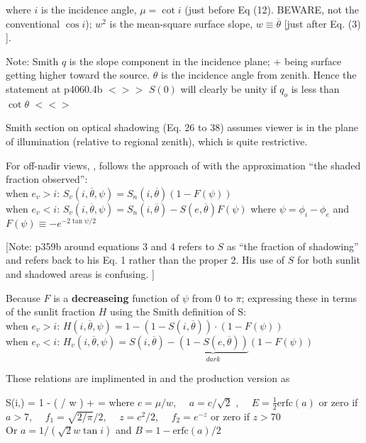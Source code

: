 \documentclass{article}
\newcommand{\erfc}{\mathrm{erfc}}  %
\newcommand{\bq}{$ < \! > \!   \! >$ } %
\newcommand{\eq}{ $< \! \! < \! > $ } %
\begin{document}
where $i$ is the incidence angle, $\mu = \cot i $ (just before Eq (12). BEWARE, not the conventional $\cos i$); $w^2$ is the mean-square
surface slope, $w \equiv \overline{\theta}$ [just after Eq. (3) ].

Note: Smith $q$ is the slope component in the incidence plane; + being surface
getting higher toward the source. $\theta$ is the incidence angle from
zenith. Hence the statement at p4060.4b \bq $S(0)$ will clearly be unity if
$q_o$ is less than $\cot \theta$ \eq

Smith section on optical shadowing (Eq. 26 to 38) assumes viewer is in the plane
of illumination (relative to regional zenith), which is quite restrictive.

  For off-nadir views,  , follows the approach of  with the approximation ``the shaded fraction observed'':
\\ when $e_v>i$: $S_v(i,\overline{\theta},\psi)=S_n(i,\overline{\theta}) \left( 1-F(\psi) \right) $
\\ when $e_v<i$: $S_v(i,\overline{\theta},\psi)=S_n(i,\overline{\theta}) -S(e,\overline{\theta})F(\psi) $
\qi  where $\psi = \phi_i-\phi_e$  and $F(\psi) \equiv -e^{-2 \tan \psi/2} $

[Note:   p359b around equations 3 and 4 refers to $S$ as ``the fraction of shadowing'' and refers back to his Eq. 1 rather than the proper 2. His use of $S$  for both sunlit and shadowed areas is confusing. ]

Because $F$ is a \textbf{decreaseing} function of $\psi$  from 0 to $\pi$;
 expressing these in terms of the sunlit fraction $H$ using the Smith definition of S:
\\ when $e_v>i$: $H(i,\overline{\theta},\psi)= 1- \left( 1-S(i,\overline{\theta})  \right)\cdot \left( 1-F(\psi) \right) $
\\ when $e_v<i$: $H_v(i,\overline{\theta},\psi)=S(i,\overline{\theta}) -\underbrace{\left( 1-S(e,\overline{\theta}) \right)}_{dark} \left( 1-F(\psi) \right) $


These relations are implimented in  and the production version
 as

\qb S(i,\overline{\theta}) =  \frac{ 1- \frac{1}{2} \erfc \left( \mu / \sqrt{2} w \right) } 
{1  -  \erfc \left(  \mu /  w \right) 
+   }
=   
\qe
where $c=\mu/w$, \ \ $a=c/\sqrt{2}$ , \ \ $E= \frac{1}{2} \erfc \left( a \right)$ or zero if $a>7$, \ \  $f_1= \sqrt{2/\pi}/2 $, \ \ $z=c^2/2$, \ \ $f_2= e^{-z}$ or zero if $z > 70$
\\ Or $a=1/( \sqrt{2}w \tan i)$ and $B=1-\erfc(a)/2$
\end{document}
